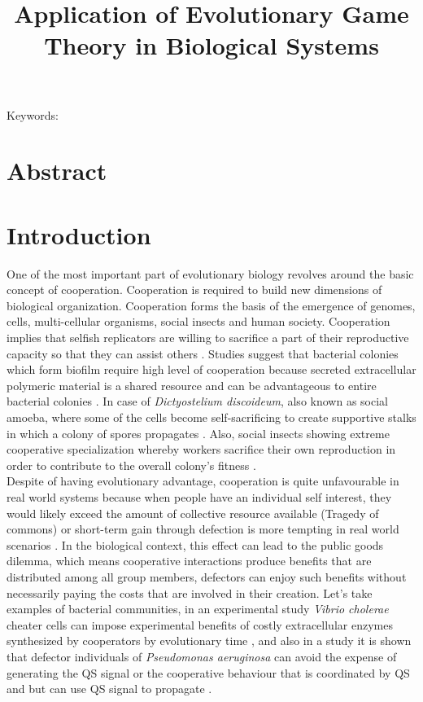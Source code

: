 \documentclass{article}
\title{\vspace*{-22mm}\bf Application of Evolutionary Game Theory in Biological Systems}
\date{}
\begin{document}
\linenumbers
\maketitle




\noindent
Keywords: 


\tableofcontents
\section{Abstract}
\section{Introduction}
One of the most important part of evolutionary biology revolves around the basic concept of cooperation. Cooperation is required to build new dimensions of biological organization. Cooperation forms the basis of the emergence of genomes, cells, multi-cellular organisms, social insects and human society. Cooperation implies that selfish replicators are willing to sacrifice a part of their reproductive capacity so that they can assist others \citep{Nowak2006}.
Studies suggest that bacterial colonies which form biofilm require high level of cooperation because secreted extracellular polymeric material is a shared resource and can be advantageous to entire bacterial colonies \citep{Xavier2007}. In case of \textit{Dictyostelium discoideum}, also known as social amoeba, where some of the cells become self-sacrificing to create supportive stalks in which a colony of spores propagates \citep{Medina2024}. Also, social insects showing extreme cooperative specialization whereby workers sacrifice their own reproduction in order to contribute to the overall colony's fitness \citep{Fischman2011}.\\
Despite of having evolutionary advantage, cooperation is quite unfavourable in real world systems because when people have an individual self interest, they would likely exceed the amount of collective resource available (Tragedy of commons) or short-term gain through defection is more tempting in real world scenarios \citep{Rankin2007}.
In the biological context, this effect can lead to the public goods dilemma, which means cooperative interactions produce benefits that are distributed among all group members, defectors can enjoy such benefits without necessarily paying the costs that are involved in their creation. 
Let's take examples of bacterial communities, in an experimental study  \textit{Vibrio cholerae} cheater cells can impose experimental benefits of costly extracellular enzymes synthesized by cooperators by evolutionary time \citep{Schluter2015}, and also in a study it is shown that defector individuals of \textit{Pseudomonas aeruginosa} can avoid the expense of generating the QS signal or the cooperative behaviour that is coordinated by QS and but can use QS signal to propagate \citep{Diggle2007}.\\
\end{document}
